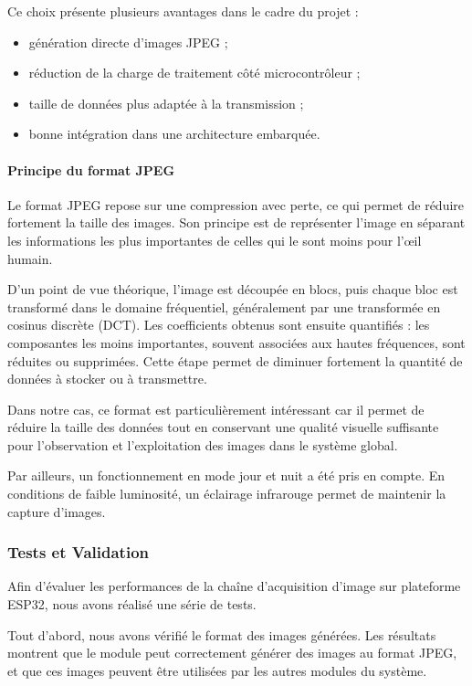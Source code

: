 ﻿\documentclass[11pt]{article}
\begin{document}
Ce choix présente plusieurs avantages dans le cadre du projet :
\begin{itemize}
\item génération directe d’images JPEG ;
\item réduction de la charge de traitement côté microcontrôleur ;
\item taille de données plus adaptée à la transmission ;
\item bonne intégration dans une architecture embarquée.
\end{itemize}

\paragraph{Principe du format JPEG}

Le format JPEG repose sur une compression avec perte, ce qui permet de réduire fortement la taille des images. Son principe est de représenter l’image en séparant les informations les plus importantes de celles qui le sont moins pour l’œil humain.

D’un point de vue théorique, l’image est découpée en blocs, puis chaque bloc est transformé dans le domaine fréquentiel, généralement par une transformée en cosinus discrète (DCT). Les coefficients obtenus sont ensuite quantifiés : les composantes les moins importantes, souvent associées aux hautes fréquences, sont réduites ou supprimées. Cette étape permet de diminuer fortement la quantité de données à stocker ou à transmettre.

Dans notre cas, ce format est particulièrement intéressant car il permet de réduire la taille des données tout en conservant une qualité visuelle suffisante pour l’observation et l’exploitation des images dans le système global.

Par ailleurs, un fonctionnement en mode jour et nuit a été pris en compte. En conditions de faible luminosité, un éclairage infrarouge permet de maintenir la capture d’images.

\subsubsection{Tests et Validation}

Afin d’évaluer les performances de la chaîne d’acquisition d’image sur plateforme ESP32, nous avons réalisé une série de tests.

Tout d’abord, nous avons vérifié le format des images générées. Les résultats montrent que le module peut correctement générer des images au format JPEG, et que ces images peuvent être utilisées par les autres modules du système.
\end{document}
